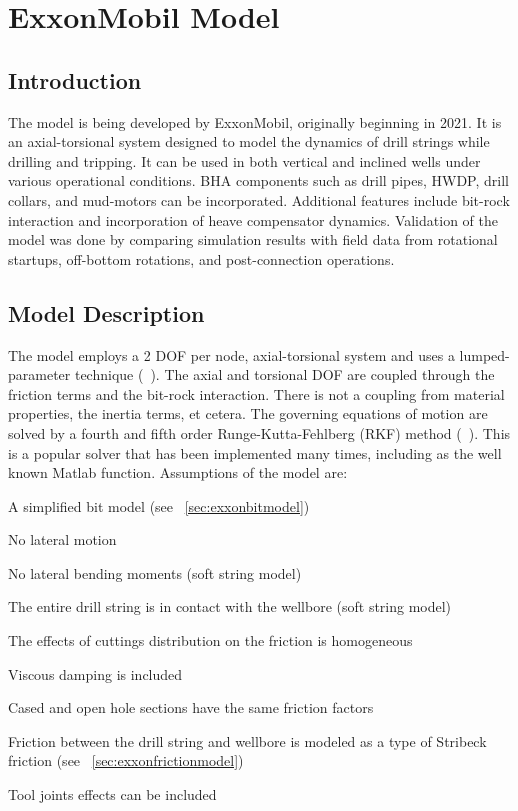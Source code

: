 \chapter{ExxonMobil Model}
\label{ch:exxonmobilmodel}

\section{Introduction}
The model is being developed by ExxonMobil, originally beginning in 2021.  It is an axial-torsional system designed to model the dynamics of drill strings while drilling and tripping. It can be used in both vertical and inclined wells under various operational conditions.  BHA components such as drill pipes, HWDP, drill collars, and mud-motors can be incorporated.  Additional features include bit-rock interaction and incorporation of heave compensator dynamics. Validation of the model was done by comparing simulation results with field data from rotational startups, off-bottom rotations, and post-connection operations.

\section{Model Description}
The model employs a 2 DOF per node, axial-torsional system and uses a lumped-parameter technique (~\cite{ref:dixit2021a}). The axial and torsional DOF are coupled through the friction terms and the bit-rock interaction.  There is not a coupling from material properties, the inertia terms, et cetera.  The governing equations of motion are solved by a fourth and fifth order Runge-Kutta-Fehlberg (RKF) method (~\cite{ref:shor2022a}).  This is a popular solver that has been implemented many times, including as the well known Matlab  function. Assumptions of the model are:
\begin{bulletedlist}
	\item A simplified bit model (see \sectionname~\ref{sec:exxonbitmodel})
	\item No lateral motion
    \item No lateral bending moments (soft string model)
    \item The entire drill string is in contact with the wellbore (soft string model)
	\item The effects of cuttings distribution on the friction is homogeneous
	\item Viscous damping is included
	\item Cased and open hole sections have the same friction factors
    \item Friction between the drill string and wellbore is modeled as a type of Stribeck friction (see \sectionname~\ref{sec:exxonfrictionmodel})
    \item Tool joints effects can be included
\end{bulletedlist}


